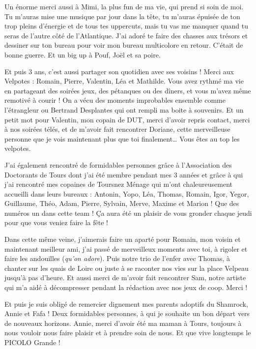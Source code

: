 \par Un énorme merci aussi à Mimi, la plus fun de ma vie, qui prend si soin de moi. Tu m’auras mise une musique par jour dans la tête, tu m’auras épuisée de ton trop pleins d’énergie et de tous tes uppercuts, mais tu vas me manquer quand tu seras de l’autre côté de l’Atlantique. J’ai adoré te faire des chasses aux trésors et dessiner sur ton bureau pour voir mon bureau multicolore en retour. C’était de bonne guerre. Et un big up à Pouf, Joël et sa poire.
\par Et puis 3 ans, c’est aussi partager son quotidien avec ses voisins ! Merci aux Velpotes : Romain, Pierre, Valentin, Léa et Mathilde. Vous avez rythmé ma vie en partageant des soirées jeux, des pétanques ou des dîners, et vous m’avez même remotivé à courir ! On a vécu des moments improbables ensemble comme l’étrangleur ou Bertrand Desplantes qui ont rempli ma boite à souvenirs. Et un petit mot pour Valentin, mon copain de DUT, merci d’avoir repris contact, merci à nos soirées télés, et de m’avoir fait rencontrer Doriane, cette merveilleuse personne que je vois maintenant plus que toi finalement… Vous êtes au top les velpotes. 
\par J’ai également rencontré de formidables personnes grâce à l’Association des Doctorants de Tours dont j’ai été membre pendant mes 3 années et grâce à qui j’ai rencontré mes copaines de Toursnez Ménage qui m’ont chaleureusement accueilli dans leurs bureaux : Antonin, Yopo, Léa, Thomas, Romain, Igor, Yegor, Guillaume, Théo, Adam, Pierre, Sylvain, Merve, Maxime et Marion ! Que des numéros un dans cette team ! Ça aura été un plaisir de vous gronder chaque jeudi pour que vous veniez faire la fête ! 
\par Dans cette même veine, j’aimerais faire un aparté pour Romain, mon voisin et maintenant meilleur ami, j’ai passé de merveilleux moments avec toi, à rigoler et faire les andouilles (\textit{qu’on adore}). Puis notre trio de l’enfer avec Thomas, à chanter sur les quais de Loire ou juste à se raconter nos vies sur la place Velpeau jusqu’à pas d’heure. Et aussi merci de m’avoir fait rencontrer Sam, notre artiste qui m’a aidé à décompresser pendant la rédaction avec nos jeux de coop. Merci !
\par Et puis je suis obligé de remercier dignement mes parents adoptifs du Shamrock, Annie et Fafa ! Deux formidables personnes, à qui je souhaite un bon départ vers de nouveaux horizons. Annie, merci d’avoir été ma maman à Tours, toujours à nous vouloir nous faire plaisir et à prendre soin de nous. Et que vive longtemps le PICOLO Grande !
